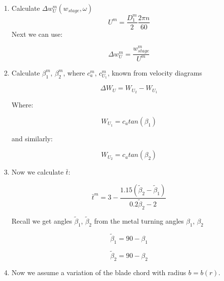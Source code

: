 \documentclass[titlepage]{article}
\begin{document}
\begin{enumerate}
    \item Calculate $\Delta w_{U}^{m}(w_{stage}, \omega)$
    \begin{equation}
        U^{m} = \frac{D_{1}^{m}}{2} \frac{2 \pi n}{60} 
    \end{equation}
    Next we can use:

    \begin{equation}
        \Delta w_{U}^{m} = \frac{w_{stage}^{m}}{U^{m}} 
    \end{equation}

    \item Calculate $\beta_{1}^{m}$, $\beta_{2}^{m}$, where $c_{a}^{m}$, $c_{U_{1}}^{m}$, known from velocity diagrams
    
    \begin{equation}
        \Delta W_{U} = W_{U_{2}} -W_{U_{1}}
    \end{equation}

    Where:

    \begin{equation}
        W_{U_{1}} = c_{a} tan(\beta_{1})
    \end{equation}

    and similarly:

    \begin{equation}
        W_{U_{2}} = c_{a} tan(\beta_{2})
    \end{equation}

    \item Now we calculate $\bar{t}$:
    
    \begin{equation}
        \bar{t}^{m} = 3 - \frac{1.15 (\tilde{\beta}_{2} -\tilde{\beta}_{1})}{0.2\tilde{\beta}_{2} -2}
    \end{equation}

    Recall we get angles $\tilde{\beta}_{1}$, $\tilde{\beta}_{2}$ from the metal turning angles $\beta_{1}$, $\beta_{2}$

    \begin{equation}
        \tilde{\beta}_{1} = 90 - \beta_{1}
    \end{equation}

    \begin{equation}
        \tilde{\beta}_{2} = 90 - \beta_{2}
    \end{equation}

    \item Now we assume a variation of the blade chord with radius $b = b(r)$.
    

\end{enumerate}
\end{document}
